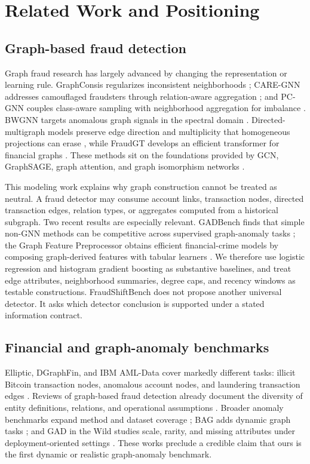 \section{Related Work and Positioning}

\subsection{Graph-based fraud detection}
Graph fraud research has largely advanced by changing the representation or learning rule. GraphConsis regularizes inconsistent neighborhoods \cite{liu2020graphconsis}; CARE-GNN addresses camouflaged fraudsters through relation-aware aggregation \cite{dou2020caregnn}; and PC-GNN couples class-aware sampling with neighborhood aggregation for imbalance \cite{liu2021pcgnn}. BWGNN targets anomalous graph signals in the spectral domain \cite{tang2022bwgnn}. Directed-multigraph models preserve edge direction and multiplicity that homogeneous projections can erase \cite{egressy2024directed,wu2023grande}, while FraudGT develops an efficient transformer for financial graphs \cite{lin2024fraudgt}. These methods sit on the foundations provided by GCN, GraphSAGE, graph attention, and graph isomorphism networks \cite{kipf2017gcn,hamilton2017graphsage,velickovic2018gat,xu2019gin}.

This modeling work explains why graph construction cannot be treated as neutral. A fraud detector may consume account links, transaction nodes, directed transaction edges, relation types, or aggregates computed from a historical subgraph. Two recent results are especially relevant. GADBench finds that simple non-GNN methods can be competitive across supervised graph-anomaly tasks \cite{tang2023gadbench}; the Graph Feature Preprocessor obtains efficient financial-crime models by composing graph-derived features with tabular learners \cite{blanusa2024gfp}. We therefore use logistic regression and histogram gradient boosting as substantive baselines, and treat edge attributes, neighborhood summaries, degree caps, and recency windows as testable constructions. FraudShiftBench does not propose another universal detector. It asks which detector conclusion is supported under a stated information contract.

\subsection{Financial and graph-anomaly benchmarks}
Elliptic, DGraphFin, and IBM AML-Data cover markedly different tasks: illicit Bitcoin transaction nodes, anomalous account nodes, and laundering transaction edges \cite{weber2019aml,huang2022dgraph,altman2023ibmaml}. Reviews of graph-based fraud detection already document the diversity of entity definitions, relations, and operational assumptions \cite{pourhabibi2020survey}. Broader anomaly benchmarks expand method and dataset coverage \cite{tang2023gadbench}; BAG adds dynamic graph tasks \cite{hua2026bag}; and GAD in the Wild studies scale, rarity, and missing attributes under deployment-oriented settings \cite{zhou2026wild}. These works preclude a credible claim that ours is the first dynamic or realistic graph-anomaly benchmark.

